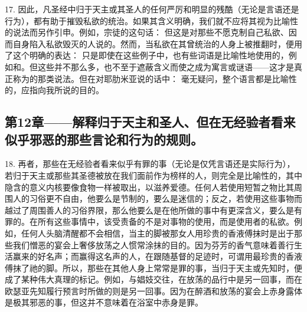 17. 因此，凡圣经中归于天主或其圣人的任何严厉和明显的残酷（无论是言语还是行为），都有助于摧毁私欲的统治。如果其含义明确，我们就不应将其视为比喻性的说法而另作引申。例如，宗徒的这句话： 但这是对那些不愿克制自己私欲、因而自身陷入私欲毁灭的人说的。然而，当私欲在其曾统治的人身上被推翻时，便用了这个明确的表达： 只是即使在这些例子中，也有些词语是比喻性地使用的，例如和。但这些并不那么多，也不至于遮蔽含义而使之成为寓言或谜语——这才是真正称为的那类说法。但在对耶肋米亚说的话中： 毫无疑问，整个语言都是比喻性的，应指向我所说的目的。\par


\subsection{第12章——解释归于天主和圣人、但在无经验者看来似乎邪恶的那些言论和行为的规则。}

18. 再者，那些在无经验者看来似乎有罪的事（无论是仅凭言语还是实际行为），若归于天主或那些其圣德被放在我们面前作为榜样的人，则完全是比喻性的，其中隐含的意义内核要像食物一样被取出，以滋养爱德。任何人若使用短暂之物比其周围人的习俗更不自由，他要么是节制的，要么是迷信的；反之，若使用这些事物而越过了周围善人的习俗界限，那么他要么是在他所做的事中有更深含义，要么是有罪的。在所有这些事情中，该受责备的不是对事物的使用，而是使用者的私欲。例如，任何人头脑清醒都不会相信，当主的脚被那女人用珍贵的香液傅抹时是出于那些我们憎恶的宴会上奢侈放荡之人惯常涂抹的目的。因为芬芳的香气意味着善行生活赢来的好名声；而赢得这名声的人，在跟随基督的足迹时，可谓用最珍贵的香液傅抹了祂的脚。所以，那些在其他人身上常常是罪的事，当归于天主或先知时，便成了某种伟大真理的标记。例如，与娼妓交往，在放荡的品行中是另一回事，而在欧瑟亚先知履行预言时所做的则是另一回事。因为在醉酒和放荡的宴会上赤身露体是极其邪恶的事，但这并不意味着在浴室中赤身是罪。\par

